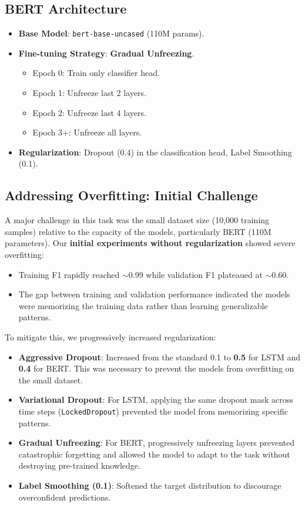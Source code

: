 \documentclass{article}
\begin{document}
\subsection{BERT Architecture}
\begin{itemize}
    \item \textbf{Base Model}: \texttt{bert-base-uncased} (110M params).
    \item \textbf{Fine-tuning Strategy}: \textbf{Gradual Unfreezing}.
    \begin{itemize}
        \item Epoch 0: Train only classifier head.
        \item Epoch 1: Unfreeze last 2 layers.
        \item Epoch 2: Unfreeze last 4 layers.
        \item Epoch 3+: Unfreeze all layers.
    \end{itemize}
    \item \textbf{Regularization}: Dropout (0.4) in the classification head, Label Smoothing (0.1).
\end{itemize}

\subsection{Addressing Overfitting: Initial Challenge}
A major challenge in this task was the small dataset size (10,000 training samples) relative to the capacity of the models, particularly BERT (110M parameters). Our \textbf{initial experiments without regularization} showed severe overfitting:
\begin{itemize}
    \item Training F1 rapidly reached $\sim$0.99 while validation F1 plateaued at $\sim$0.60.
    \item The gap between training and validation performance indicated the models were memorizing the training data rather than learning generalizable patterns.
\end{itemize}

To mitigate this, we progressively increased regularization:
\begin{itemize}
    \item \textbf{Aggressive Dropout}: Increased from the standard 0.1 to \textbf{0.5} for LSTM and \textbf{0.4} for BERT. This was necessary to prevent the models from overfitting on the small dataset.
    \item \textbf{Variational Dropout}: For LSTM, applying the same dropout mask across time steps (\texttt{LockedDropout}) prevented the model from memorizing specific patterns.
    \item \textbf{Gradual Unfreezing}: For BERT, progressively unfreezing layers prevented catastrophic forgetting and allowed the model to adapt to the task without destroying pre-trained knowledge.
    \item \textbf{Label Smoothing (0.1)}: Softened the target distribution to discourage overconfident predictions.
\end{itemize}
\end{document}
